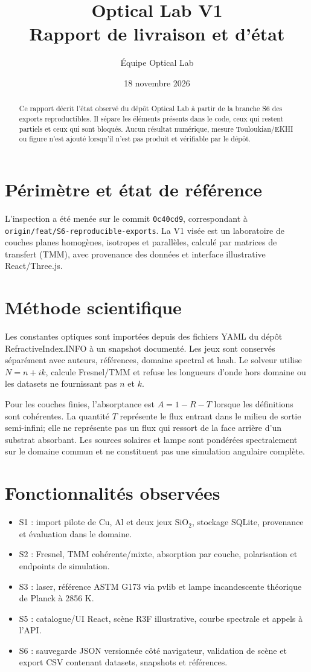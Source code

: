 \documentclass[11pt,a4paper]{article}
\title{Optical Lab V1\\Rapport de livraison et d'état}
\author{Équipe Optical Lab}
\date{18 novembre 2026}
\begin{document}
\maketitle
\begin{abstract}
Ce rapport décrit l'état observé du dépôt Optical Lab à partir de la branche S6 des exports reproductibles. Il sépare les éléments présents dans le code, ceux qui restent partiels et ceux qui sont bloqués. Aucun résultat numérique, mesure Touloukian/EKHI ou figure n'est ajouté lorsqu'il n'est pas produit et vérifiable par le dépôt.
\end{abstract}
\section{Périmètre et état de référence}
L'inspection a été menée sur le commit \texttt{0c40cd9}, correspondant à \texttt{origin/feat/S6-reproducible-exports}. La V1 visée est un laboratoire de couches planes homogènes, isotropes et parallèles, calculé par matrices de transfert (TMM), avec provenance des données et interface illustrative React/Three.js.
\section{Méthode scientifique}
Les constantes optiques sont importées depuis des fichiers YAML du dépôt RefractiveIndex.INFO à un snapshot documenté. Les jeux sont conservés séparément avec auteurs, références, domaine spectral et hash. Le solveur utilise \(N=n+ik\), calcule Fresnel/TMM et refuse les longueurs d'onde hors domaine ou les datasets ne fournissant pas \(n\) et \(k\).

Pour les couches finies, l'absorptance est \(A=1-R-T\) lorsque les définitions sont cohérentes. La quantité \(T\) représente le flux entrant dans le milieu de sortie semi-infini; elle ne représente pas un flux qui ressort de la face arrière d'un substrat absorbant. Les sources solaires et lampe sont pondérées spectralement sur le domaine commun et ne constituent pas une simulation angulaire complète.
\section{Fonctionnalités observées}
\begin{itemize}
\item S1 : import pilote de Cu, Al et deux jeux SiO$_2$, stockage SQLite, provenance et évaluation dans le domaine.
\item S2 : Fresnel, TMM cohérente/mixte, absorption par couche, polarisation et endpoints de simulation.
\item S3 : laser, référence ASTM G173 via pvlib et lampe incandescente théorique de Planck à 2856 K.
\item S5 : catalogue/UI React, scène R3F illustrative, courbe spectrale et appels à l'API.
\item S6 : sauvegarde JSON versionnée côté navigateur, validation de scène et export CSV contenant datasets, snapshots et références.
\end{itemize}
\end{document}
